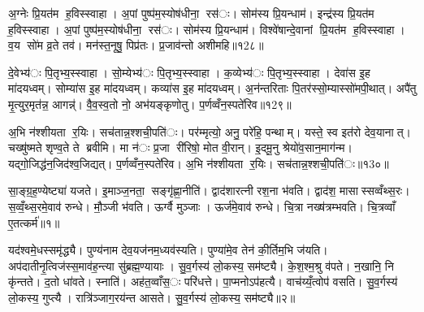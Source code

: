 अ॒ग्नेः प्रि॒यत॑म ह॒विस्स्वाहा। अ॒पां पुष्प॑म॒स्योष॑धीना॒ रस॑ः। सोम॑स्य प्रि॒यन्धाम॑। इन्द्र॑स्य प्रि॒यत॑म ह॒विस्स्वाहा। अ॒पां पुष्प॑म॒स्योष॑धीना॒ रस॑ः। सोम॑स्य प्रि॒यन्धाम॑। विश्वे॑षान्दे॒वानां प्रि॒यत॑म ह॒विस्स्वाहा। व॒य सो॑म व्र॒ते तव॑। मन॑स्त॒नूषु॒ पिप्र॑तः। प्र॒जाव॑न्तो अशीमहि॥१2८॥

दे॒वेभ्य॑ः पि॒तृभ्य॒स्स्वाहा। सो॒म्येभ्य॑ः पि॒तृभ्य॒स्स्वाहा। क॒व्येभ्य॑ः पि॒तृभ्य॒स्स्वाहा। देवा॑स इ॒ह मा॑दयध्वम्। सोम्या॑स इ॒ह मा॑दयध्वम्। कव्या॑स इ॒ह मा॑दयध्वम्। अ॒न॑न्तरिताः पि॒तर॑स्सो॒म्यास्सो॑मपी॒थात्। अपै॑तु मृ॒त्युर॒मृत॑न्न॒ आगन्न्॑। वै॒व॒स्व॒तो नो॒ अभ॑यङ्कृणोतु। प॒र्णव्वँन॒स्पते॑रिव॥१2९॥

अ॒भि न॑श्शीयता र॒यिः। सच॑तान्न॒श्शची॒पति॑ः। पर॑म्मृत्यो॒ अनु॒ परे॑हि॒ पन्थाम्। यस्ते॒ स्व इत॑रो देव॒यानात्। चख्षु॑ष्मते शृण्व॒ते ते ब्रवीमि। मा न॑ः प्र॒जा री॑रिषो॒ मोत वी॒रान्। इ॒दमू॒नु श्रेयो॑व॒सान॒माग॑न्म। यद्गो॒जिद्ध॑न॒जिद॑श्व॒जिद्यत्। प॒र्णव्वँन॒स्पते॑रिव। अ॒भि न॑श्शीयता र॒यिः। सच॑तान्न॒श्शची॒पति॑ः॥१3०॥




सा॒ङ्ग्र॒ह॒ण्येष्ट्या॑ यजते। इ॒माञ्ज॒नता॒ सङ्गृ॑ह्णा॒नीति॑। द्वाद॑शारत्नी रश॒ना भ॑वति। द्वाद॑श॒ मासास्सव्वँथ्स॒रः। स॒व्वँ॒थ्स॒रमे॒वाव॑ रुन्धे। मौ॒ञ्जी भ॑वति। ऊर्ग्वै मुञ्जाः। ऊर्ज॑मे॒वाव॑ रुन्धे। चि॒त्रा नख्ष॑त्रम्भवति। चि॒त्रव्वाँ ए॒तत्कर्म॑॥१॥

यद॑श्वमे॒धस्समृ॑द्ध्यै। पुण्य॑नाम देव॒यज॑नम॒ध्यव॑स्यति। पुण्या॑मे॒व तेन॑ की॒र्तिम॒भि ज॑यति। अप॑दातीनृ॒त्विज॑स्स॒माव॑ह॒न्त्या सु॑ब्रह्म॒ण्यायाः। सु॒व॒र्गस्य॑ लो॒कस्य॒ सम॑ष्ट्यै। के॒श॒श्म॒श्रु व॑पते। न॒खानि॒ नि कृ॑न्तते। द॒तो धा॑वते। स्नाति॑। अह॑त॒व्वाँस॒ः परि॑धत्ते। पा॒प्मनोऽप॑हत्यै। वाच॑य्यँ॒त्वोप॑ वसति। सु॒व॒र्गस्य॑ लो॒कस्य॒ गुप्त्यै। रात्रि॑ञ्जाग॒रय॑न्त आसते। सु॒व॒र्गस्य॑ लो॒कस्य॒ सम॑ष्ट्यै॥२॥

